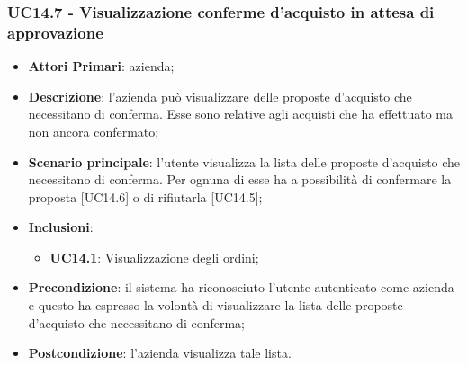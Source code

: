 \subsubsection{UC14.7 - Visualizzazione conferme d'acquisto in attesa di approvazione}
\begin{itemize}
	\item \textbf{Attori Primari}: azienda;
	\item \textbf{Descrizione}: l'azienda può visualizzare delle proposte d'acquisto che necessitano di conferma. Esse sono relative agli acquisti che ha effettuato ma non ancora confermato;
	\item \textbf{Scenario principale}: l'utente visualizza la lista delle proposte d'acquisto che necessitano di conferma. Per ognuna di esse ha a possibilità di confermare la proposta [UC14.6] o di rifiutarla [UC14.5];
	\item \textbf{Inclusioni}:
	\begin{itemize}
		\item \textbf{UC14.1}: Visualizzazione degli ordini;
	\end{itemize}
	\item \textbf{Precondizione}: il sistema ha riconosciuto l'utente autenticato come azienda e questo ha espresso la volontà di visualizzare la lista delle proposte d'acquisto che necessitano di conferma;
	\item \textbf{Postcondizione}: l'azienda visualizza tale lista.
\end{itemize}





